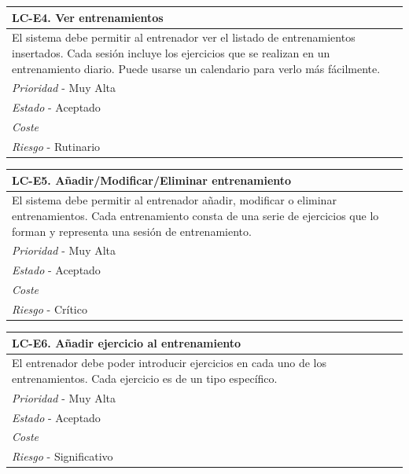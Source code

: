 	\begin{center}
		\begin{tabularx}{15cm}{|X|}
			\hline 
				\bf{LC-E4. Ver entrenamientos}\\
			\hline
				El sistema debe permitir al entrenador ver el listado de entrenamientos insertados. Cada sesión incluye los ejercicios que se realizan en un entrenamiento diario. Puede usarse un calendario para verlo más fácilmente.\\
			\hline
				{\it Prioridad} - Muy Alta\\
			\hline
				{\it Estado} - Aceptado\\
			\hline
				{\it Coste}\\
			\hline
				{\it Riesgo} - Rutinario\\
			\hline
		\end{tabularx}
	\end{center}
	
	\begin{center}
		\begin{tabularx}{15cm}{|X|}
			\hline 
				\bf{LC-E5. Añadir/Modificar/Eliminar entrenamiento}\\
			\hline
				El sistema debe permitir al entrenador añadir, modificar o eliminar entrenamientos. Cada entrenamiento consta de una serie de ejercicios que lo forman y representa una sesión de entrenamiento.\\
			\hline
				{\it Prioridad} - Muy Alta\\
			\hline
				{\it Estado} - Aceptado\\
			\hline
				{\it Coste}\\
			\hline
				{\it Riesgo} - Crítico\\
			\hline
		\end{tabularx}
	\end{center}
	
	\begin{center}
		\begin{tabularx}{15cm}{|X|}
			\hline 
				\bf{LC-E6. Añadir ejercicio al entrenamiento}\\
			\hline
				El entrenador debe poder introducir ejercicios en cada uno de los entrenamientos. Cada ejercicio es de un tipo específico.\\
			\hline
				{\it Prioridad} - Muy Alta\\
			\hline
				{\it Estado} - Aceptado\\
			\hline
				{\it Coste}\\
			\hline
				{\it Riesgo} - Significativo\\
			\hline
		\end{tabularx}
	\end{center}
	
